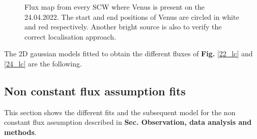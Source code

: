 \documentclass[
	a4paper, %
	10pt, %
	unnumberedsections, %
	twoside, %
]{LTJournalArticle}
\begin{document}
\begin{figure}[H]
\begin{subfigure}{.45\textwidth}
        \end{subfigure}
        \caption{Flux map from every SCW where Venus is present on the 24.04.2022. The start and end positions of Venus are circled in white and red respectively. Another bright source is also to verify the correct localisation approach.}
        \label{24_map}
    \end{figure}

The 2D gaussian models fitted to obtain the different fluxes of \textbf{Fig.} \ref{22_lc} and \ref{24_lc} are the following.

\subsection{Non constant flux assumption fits}
This section shows the different fits and the subsequent model for the non constant flux assumption described in \textbf{Sec. Observation, data analysis and methods}.
\end{document}

